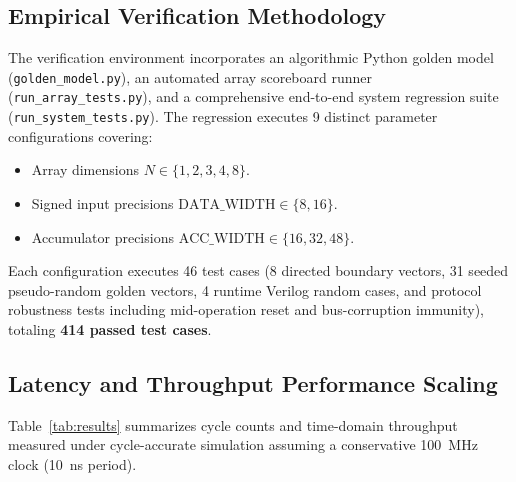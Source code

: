 \documentclass[conference]{IEEEtran}
\begin{document}
\subsection{Empirical Verification Methodology}
The verification environment incorporates an algorithmic Python golden model (\texttt{golden\_model.py}), an automated array scoreboard runner (\texttt{run\_array\_tests.py}), and a comprehensive end-to-end system regression suite (\texttt{run\_system\_tests.py}). The regression executes 9 distinct parameter configurations covering:
\begin{itemize}
    \item Array dimensions $N \in \{1, 2, 3, 4, 8\}$.
    \item Signed input precisions $\text{DATA\_WIDTH} \in \{8, 16\}$.
    \item Accumulator precisions $\text{ACC\_WIDTH} \in \{16, 32, 48\}$.
\end{itemize}
Each configuration executes 46 test cases (8 directed boundary vectors, 31 seeded pseudo-random golden vectors, 4 runtime Verilog random cases, and protocol robustness tests including mid-operation reset and bus-corruption immunity), totaling \textbf{414 passed test cases}.

\subsection{Latency and Throughput Performance Scaling}
Table~\ref{tab:results} summarizes cycle counts and time-domain throughput measured under cycle-accurate simulation assuming a conservative 100~MHz clock (10~ns period).
\end{document}
